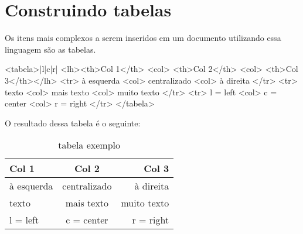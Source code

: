 \newpage \chapter{Construindo tabelas}\setcounter{SteP}{1}
\label{sec:tabelas}

Os itens mais complexos a serem inseridos em um documento utilizando essa linguagem
são as tabelas.

\begin{BoxVerbatim}
    <tabela>{|l|c|r|}
        <lh><th>Col 1</th> <col> <th>Col 2</th> <col> <th>Col 3</th></lh>
        <tr> à esquerda <col> centralizado <col> à direita </tr>
        <tr> texto      <col> mais texto   <col> muito texto </tr>
        <tr> l = left   <col> c = center   <col> r = right   </tr>
    </tabela>
\end{BoxVerbatim}

O resultado dessa tabela é o seguinte:

    \begin{table}[H]
  \begin{center}
  \begin{tabular}{|l|c|r|}
        \hline{\bf Col 1} 	&	 {\bf Col 2} 	&	 {\bf Col 3} \\ \hline \hline
         à esquerda 	&	 centralizado 	&	 à direita  \\ \hline
         texto      	&	 mais texto   	&	 muito texto  \\ \hline
         l = left   	&	 c = center   	&	 r = right    \\ \hline
\end{tabular}
        \caption{tabela exemplo}
        \label{tab:exemplo}
      \end{center}
\end{table}

